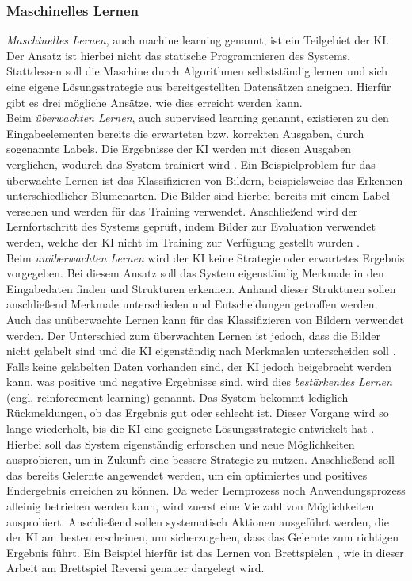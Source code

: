 \documentclass[12pt,a4paper,bibliography=totocnumbered,listof=totocnumbered]{article}
\begin{document}
\subsubsection{Maschinelles Lernen} \label{sec:machine_learning}
\textit{Maschinelles Lernen}, auch machine learning genannt, ist ein Teilgebiet der KI. Der Ansatz ist hierbei nicht das statische Programmieren des Systems. Stattdessen soll die Maschine durch Algorithmen selbstständig lernen und sich eine eigene Lösungsstrategie aus bereitgestellten Datensätzen aneignen. Hierfür gibt es drei mögliche Ansätze, wie dies erreicht werden kann.\\ 
Beim \emph{überwachten Lernen}, auch supervised learning genannt, existieren zu den Eingabeelementen bereits die erwarteten bzw. korrekten Ausgaben, durch sogenannte Labels. Die Ergebnisse der KI werden mit diesen Ausgaben verglichen, wodurch das System trainiert wird \citep[S.199]{UweLammel.2020}. Ein Beispielproblem für das überwachte Lernen ist das Klassifizieren von Bildern, beispielsweise das Erkennen unterschiedlicher Blumenarten. Die Bilder sind hierbei bereits mit einem Label versehen und werden für das Training verwendet. Anschließend wird der Lernfortschritt des Systems geprüft, indem Bilder zur Evaluation verwendet werden, welche der KI nicht im Training zur Verfügung gestellt wurden \citep[S. 20 f.]{Frochte.2019}.\\
Beim \emph{unüberwachten Lernen} wird der KI keine Strategie oder erwartetes Ergebnis vorgegeben. Bei diesem Ansatz soll das System eigenständig Merkmale in den Eingabedaten finden und Strukturen erkennen. Anhand dieser Strukturen sollen anschließend Merkmale unterschieden und Entscheidungen getroffen werden.\\
Auch das unüberwachte Lernen kann für das Klassifizieren von Bildern verwendet werden. Der Unterschied zum überwachten Lernen ist jedoch, dass die Bilder nicht gelabelt sind und die KI eigenständig nach Merkmalen unterscheiden soll \citep[S. 24 f.]{Frochte.2019}.\\
Falls keine gelabelten Daten vorhanden sind, der KI jedoch beigebracht werden kann, was positive und negative Ergebnisse sind, wird dies \emph{bestärkendes Lernen} (engl. reinforcement learning) genannt. Das System bekommt lediglich Rückmeldungen, ob das Ergebnis gut oder schlecht ist. Dieser Vorgang wird so lange wiederholt, bis die KI eine geeignete Lösungsstrategie entwickelt hat \citep[S. 331]{Frochte.2019}. Hierbei soll das System  eigenständig erforschen und neue Möglichkeiten ausprobieren, um in Zukunft eine bessere Strategie zu nutzen. Anschließend soll das bereits Gelernte angewendet werden, um ein optimiertes und positives Endergebnis erreichen zu können. Da weder Lernprozess noch Anwendungsprozess alleinig betrieben werden kann, wird zuerst eine Vielzahl von Möglichkeiten ausprobiert. Anschließend sollen systematisch Aktionen ausgeführt werden, die der KI am besten erscheinen, um sicherzugehen, dass das Gelernte zum richtigen Ergebnis führt. Ein Beispiel hierfür ist das Lernen von Brettspielen \cite[S. 1 ff.]{Sutton.2018}, wie in dieser Arbeit am Brettspiel Reversi genauer dargelegt wird.\\
\end{document}
